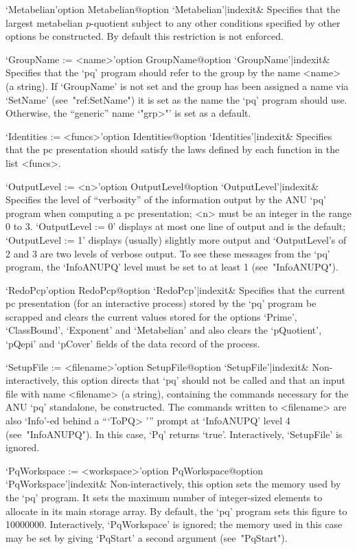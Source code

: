 \>`Metabelian'{option Metabelian}@{option `Metabelian'|indexit}&
Specifies that the largest metabelian $p$-quotient subject to  any  other
conditions specified by other options be  constructed.  By  default  this
restriction is not enforced.

\>`GroupName := <name>'{option GroupName}@{option `GroupName'|indexit}&
Specifies that the `pq' program should refer to  the  group  by  the  name
<name> (a string). If `GroupName' is not  set  and  the  group  has  been
assigned a name via `SetName' (see~"ref:SetName") it is set as  the  name
the `pq' program should use. Otherwise, the ``generic'' name `"\<grp>"' is
set as a default.

\>`Identities := <funcs>'{option Identities}@{option `Identities'|indexit}&
Specifies that the pc presentation should satisfy the laws defined by each
function in the list <funcs>.

\>`OutputLevel := <n>'{option OutputLevel}@{option `OutputLevel'|indexit}&
Specifies the level of ``verbosity'' of the information output by the ANU
`pq' program when computing a pc presentation; <n> must be an  integer  in
the range 0 to 3. `OutputLevel := 0' displays at most one line of  output
and is the default; `OutputLevel := 1' displays (usually)  slightly  more
output and `OutputLevel's of 2 and 3 are two levels of verbose output. To
see these messages from the `pq' program, the `InfoANUPQ'  level  must  be
set to at least 1 (see~"InfoANUPQ").

\>`RedoPcp'{option RedoPcp}@{option `RedoPcp'|indexit}&
Specifies that the current pc presentation (for an  interactive  process)
stored by the `pq' program be  scrapped  and  clears  the  current  values
stored for the options `Prime', `ClassBound', `Exponent' and `Metabelian'
and also clears the `pQuotient', `pQepi' and `pCover' fields of the  data
record of the process.

\>`SetupFile := <filename>'{option SetupFile}@{option `SetupFile'|indexit}&
Non-interactively, this option directs that `pq' should not be called and
that an input file  with  name  <filename>  (a  string),  containing  the
commands necessary for the  ANU  `pq'  standalone,  be  constructed.  The
commands written to <filename> are also `Info'-ed behind  a  ```ToPQ> '''
prompt at `InfoANUPQ' level  4  (see~"InfoANUPQ").  In  this  case,  `Pq'
returns `true'. Interactively, `SetupFile' is ignored.

\>`PqWorkspace := <workspace>'{option PqWorkspace}@{option `PqWorkspace'|indexit}&
Non-interactively, this option sets the memory used by the  `pq'  program.
It sets the maximum number of integer-sized elements to allocate  in  its
main storage array. By default, the  `pq'  program  sets  this  figure  to
10000000. Interactively, `PqWorkspace' is ignored;  the  memory  used  in
this  case  may  be  set  by   giving   `PqStart'   a   second   argument
(see~"PqStart").

